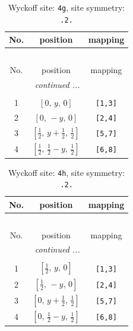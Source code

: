 \documentclass[fleqn,8pt]{jsarticle}
\begin{document}
\renewcommand{\arraystretch}{1.2}
\begin{longtable}{ccc}
\caption{Wyckoff site: {\tt 4g}, site symmetry: {\tt .2.}}
 \\
 \hline \hline
No. & position & mapping \\ \hline \endfirsthead

\multicolumn{2}{l}{\tablename\ \thetable{}} \\
 \hline \hline
No. & position & mapping \\ \hline \endhead

 \hline \hline
\multicolumn{2}{r}{\footnotesize\it continued ...} \\ \endfoot

 \hline \hline
\multicolumn{2}{r}{} \\ \endlastfoot

1 & $\left[ 0,\, y,\, 0 \right]$ & {\tt [1,3]} \\ \hline
2 & $\left[ 0,\, - y,\, 0 \right]$ & {\tt [2,4]} \\ \hline
3 & $\left[ \frac{1}{2},\, y + \frac{1}{2},\, \frac{1}{2} \right]$ & {\tt [5,7]} \\ \hline
4 & $\left[ \frac{1}{2},\, \frac{1}{2} - y,\, \frac{1}{2} \right]$ & {\tt [6,8]} \\
\end{longtable}
\renewcommand{\arraystretch}{1.2}
\begin{longtable}{ccc}
\caption{Wyckoff site: {\tt 4h}, site symmetry: {\tt .2.}}
 \\
 \hline \hline
No. & position & mapping \\ \hline \endfirsthead

\multicolumn{2}{l}{\tablename\ \thetable{}} \\
 \hline \hline
No. & position & mapping \\ \hline \endhead

 \hline \hline
\multicolumn{2}{r}{\footnotesize\it continued ...} \\ \endfoot

 \hline \hline
\multicolumn{2}{r}{} \\ \endlastfoot

1 & $\left[ \frac{1}{2},\, y,\, 0 \right]$ & {\tt [1,3]} \\ \hline
2 & $\left[ \frac{1}{2},\, - y,\, 0 \right]$ & {\tt [2,4]} \\ \hline
3 & $\left[ 0,\, y + \frac{1}{2},\, \frac{1}{2} \right]$ & {\tt [5,7]} \\ \hline
4 & $\left[ 0,\, \frac{1}{2} - y,\, \frac{1}{2} \right]$ & {\tt [6,8]} \\
\end{longtable}
\end{document}
